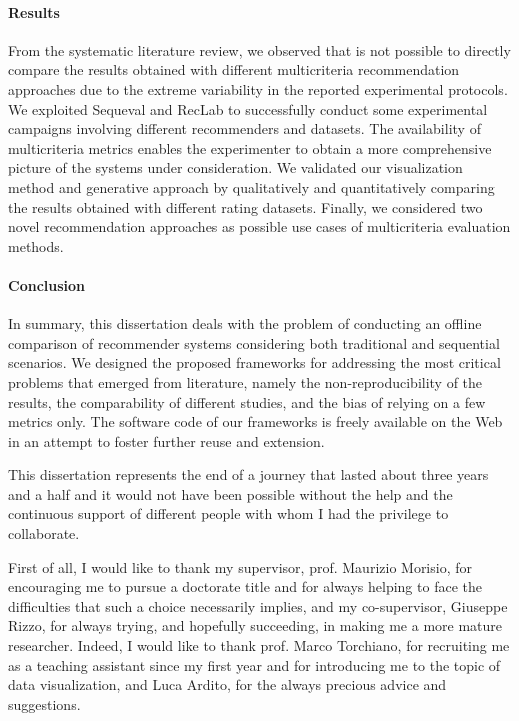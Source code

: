 \paragraph{Results}

From the systematic literature review, we observed that is not possible to directly compare the results obtained with different multicriteria recommendation approaches due to the extreme variability in the reported experimental protocols. We exploited Sequeval and RecLab to successfully conduct some experimental campaigns involving different recommenders and datasets. The availability of multicriteria metrics enables the experimenter to obtain a more comprehensive picture of the systems under consideration. We validated our visualization method and generative approach by qualitatively and quantitatively comparing the results obtained with different rating datasets. Finally, we considered two novel recommendation approaches as possible use cases of multicriteria evaluation methods.

\paragraph{Conclusion}

In summary, this dissertation deals with the problem of conducting an offline comparison of recommender systems considering both traditional and sequential scenarios. We designed the proposed frameworks for addressing the most critical problems that emerged from literature, namely the non-reproducibility of the results, the comparability of different studies, and the bias of relying on a few metrics only. The software code of our frameworks is freely available on the Web in an attempt to foster further reuse and extension.

\acknowledgements

This dissertation represents the end of a journey that lasted about three years and a half and it would not have been possible without the help and the continuous support of different people with whom I had the privilege to collaborate.

First of all, I would like to thank my supervisor, prof. Maurizio Morisio, for encouraging me to pursue a doctorate title and for always helping to face the difficulties that such a choice necessarily implies, and my co-supervisor, Giuseppe Rizzo, for always trying, and hopefully succeeding, in making me a more mature researcher. Indeed, I would like to thank prof. Marco Torchiano, for recruiting me as a teaching assistant since my first year and for introducing me to the topic of data visualization, and Luca Ardito, for the always precious advice and suggestions.

